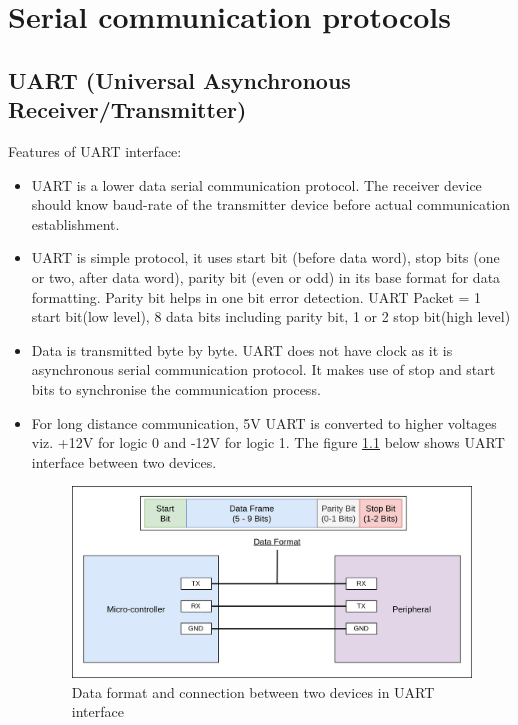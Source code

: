 \chapter{Serial communication protocols} \label{Basics_motor_control}

\section{UART (Universal Asynchronous Receiver/Transmitter)}
Features of UART interface:
\begin{itemize}
    \item UART is a lower data serial communication protocol. The receiver device should know baud-rate of the transmitter device before actual communication establishment.
    \item UART is simple protocol, it uses start bit (before data word), stop bits (one or two, after data word), parity bit (even or odd) in its base format for data formatting. Parity bit helps in one bit error detection. UART Packet = 1 start bit(low level), 8 data bits including parity bit, 1 or 2 stop bit(high level)
    \item Data is transmitted byte by byte. UART does not have clock as it is asynchronous serial communication protocol. It makes use of stop and start bits to synchronise the communication process.
    \item For long distance communication, 5V UART is converted to higher voltages viz. +12V for logic 0 and -12V for logic 1. The figure \ref{UART} below shows UART interface between two devices.
    
    \begin{figure}[h!]
    \centering
    \includegraphics[width=12cm]{./Figures/UART.png}
    \caption{Data format and connection between two devices in UART interface}
    \label{UART}
    \end{figure}
\end{itemize}

